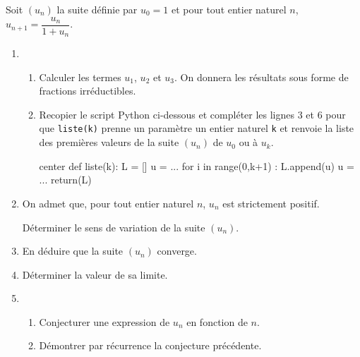 Soit $\left(u_n\right)$ la suite définie par $u_0 = 1$ et pour tout entier naturel $n$, $u_{n+1} = \dfrac{u_n}{1 + u_n}$.

\begin{enumerate}
	\item 
	\begin{enumerate}
		\item Calculer les termes $u_1$, $u_2$  et $u_3$. On  donnera les résultats sous forme de fractions irréductibles.
		\item Recopier le script \textsf{Python} ci-dessous et compléter les lignes 3 et 6 pour que \texttt{liste(k)} prenne un paramètre un entier naturel \texttt{k} et renvoie la liste des premières valeurs de la suite $\left(u_n\right)$ de $u_0$ ou à $u_k$.
		
\begin{CodePythonLstAlt}[Largeur=8cm]{center}
def liste(k):
	L = []
	u = ...
	for i in range(0,k+1) :
		L.append(u)
		u = ...
	return(L)
\end{CodePythonLstAlt}
	\end{enumerate}
	\item On admet que, pour tout entier naturel $n$, $u_n$ est strictement positif.
	
	Déterminer le sens de variation de la suite $\left(u_n\right)$.
	\item En déduire que la suite $\left(u_n\right)$ converge.
	\item Déterminer la valeur de sa limite.
	\item 
	\begin{enumerate}
		\item Conjecturer une expression de $u_n$ en fonction de $n$.
		\item Démontrer par récurrence la conjecture précédente.
	\end{enumerate}
\end{enumerate}

